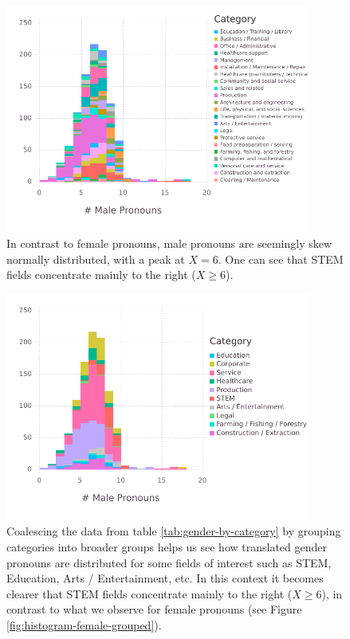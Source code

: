 \documentclass[fleqn,10pt]{article}
\begin{document}
\begin{figure}[H]
	\centering
	\includegraphics[width=10cm]{pictures/histogram-male}
	\caption{In contrast to female pronouns, male pronouns are seemingly skew normally distributed, with a peak at $X = 6$. One can see that STEM fields concentrate mainly to the right ($X \geq 6$).}
	\label{fig:histogram-male}
\end{figure}

\begin{figure}[H]
	\centering
	\includegraphics[width=10cm]{pictures/histogram-male-grouped}
	\caption{Coalescing the data from table \ref{tab:gender-by-category} by grouping categories into broader groups helps us see how translated gender pronouns are distributed for some fields of interest such as STEM, Education, Arts / Entertainment, etc. In this context it becomes clearer that STEM fields concentrate mainly to the right ($X \geq 6$), in contrast to what we observe for female pronouns (see Figure \ref{fig:histogram-female-grouped}).}
	\label{fig:histogram-male-grouped}
\end{figure}
\end{document}
